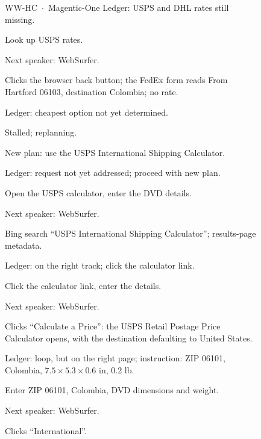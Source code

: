 \begin{figure}[p]
\begin{minipage}{\textwidth}
\begin{qbox}{\textsc{WW-HC} \,$\cdot$\, Magentic-One}
Ledger: USPS and DHL rates still missing.

Look up USPS rates.

Next speaker: WebSurfer.

Clicks the browser back button; the FedEx form reads From Hartford 06103, destination
Colombia; no rate.

Ledger: cheapest option not yet determined.

Stalled; replanning.

New plan: use the USPS International Shipping Calculator.

Ledger: request not yet addressed; proceed with new plan.

Open the USPS calculator, enter the DVD details.

Next speaker: WebSurfer.

Bing search ``USPS International Shipping Calculator''; results-page metadata.

Ledger: on the right track; click the calculator link.

Click the calculator link, enter the details.

Next speaker: WebSurfer.

Clicks ``Calculate a Price'': the USPS Retail Postage Price Calculator opens, with the
destination defaulting to United States.

Ledger: loop, but on the right page; instruction: ZIP 06101, Colombia,
$7.5\times5.3\times0.6$ in, 0.2 lb.

Enter ZIP 06101, Colombia, DVD dimensions and weight.

Next speaker: WebSurfer.

Clicks ``International''.


\end{qbox}
\end{minipage}
\end{figure}
